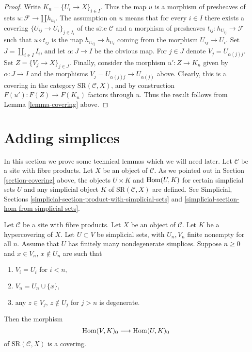 \begin{proof}
Write $K_n = \{U_i \to X\}_{i \in I}$.
Thus the map $u$ is a morphism of presheaves of sets
$u : \mathcal{F} \to \amalg h_{u_i}$.
The assumption on $u$ means that for every
$i \in I$ there exists a covering $\{U_{ij} \to U_i\}_{j \in I_i}$
of the site $\mathcal{C}$ and a morphism of presheaves
$t_{ij} : h_{U_{ij}} \to \mathcal{F}$ such that
$u \circ t_{ij}$ is the map $h_{U_{ij}} \to h_{U_i}$
coming from the morphism $U_{ij} \to U_i$.
Set $J = \amalg_{i \in I} I_i$, and let
$\alpha : J \to I$ be the obvious map.
For $j \in J$ denote $V_j = U_{\alpha(j)j}$. Set
$Z = \{V_j \to X\}_{j \in J}$.
Finally, consider the morphism
$u' : Z \to K_n$ given by $\alpha : J \to I$
and the morphisms $V_j = U_{\alpha(j)j} \to U_{\alpha(j)}$
above. Clearly, this is a covering in the
category $\text{SR}(\mathcal{C}, X)$, and by
construction $F(u') : F(Z) \to F(K_n)$ factors through $u$.
Thus the result follows from Lemma \ref{lemma-covering} above.
\end{proof}


\section{Adding simplices}
\label{section-adding-simplices}

\noindent
In this section we prove some technical lemmas which we will need later.
Let $\mathcal{C}$ be a site with fibre products.
Let $X$ be an object of $\mathcal{C}$.
As we pointed out in Section \ref{section-covering} above,
the objects $U \times K$ and $\mathop{\rm Hom}\nolimits(U, K)$
for certain simplicial sets $U$
and any simplicial object $K$ of $\text{SR}(\mathcal{C}, X)$
are defined. See Simplicial, Sections
\ref{simplicial-section-product-with-simplicial-sets} and
\ref{simplicial-section-hom-from-simplicial-sets}.

\begin{lemma}
\label{lemma-one-more-simplex}
Let $\mathcal{C}$ be a site with fibre products.
Let $X$ be an object of $\mathcal{C}$.
Let $K$ be a hypercovering of $X$.
Let $U \subset V$ be simplicial sets, with $U_n, V_n$
finite nonempty for all $n$.
Assume that $U$ has finitely many nondegenerate simplices.
Suppose $n \geq 0$ and $x \in V_n$,
$x \not \in U_n$ are such that
\begin{enumerate}
\item $V_i = U_i$ for $i < n$,
\item $V_n = U_n \cup \{x\}$,
\item any $z \in V_j$, $z \not \in U_j$ for $j > n$
is degenerate.
\end{enumerate}
Then the morphism
$$
\mathop{\rm Hom}\nolimits(V, K)_0
\longrightarrow
\mathop{\rm Hom}\nolimits(U, K)_0
$$
of $\text{SR}(\mathcal{C}, X)$ is a covering.
\end{lemma}

